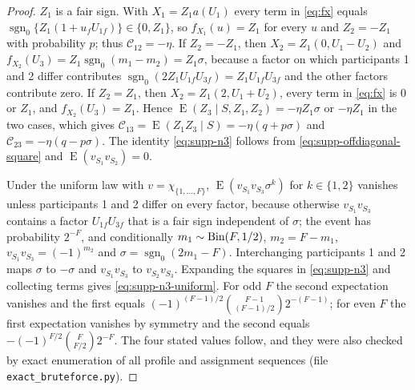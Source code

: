 \documentclass[12pt,a4paper]{article}
\theoremstyle{definition}
\theoremstyle{remark}\newtheorem{remark}{Remark}
\numberwithin{equation}{section}
\newcommand{\E}{\operatorname{E}}
\newcommand{\sg}{\operatorname{sgn}_0}
\begin{document}
\begin{proof}
$Z_1$ is a fair sign. With $X_1=Z_1a(U_1)$ every term in \eqref{eq:fx} equals $\sg\{Z_1(1+u_fU_{1f})\}\in\{0,Z_1\}$, so $f_{X_1}(u)=Z_1$ for every $u$ and $Z_2=-Z_1$ with probability $p$; thus $\mathcal C_{12}=-\eta$. If $Z_2=-Z_1$, then $X_2=Z_1(0,U_1-U_2)$ and $f_{X_2}(U_3)=Z_1\sg(m_1-m_2)=Z_1\sigma$, because a factor on which participants 1 and 2 differ contributes $\sg(2Z_1U_{1f}U_{3f})=Z_1U_{1f}U_{3f}$ and the other factors contribute zero. If $Z_2=Z_1$, then $X_2=Z_1(2,U_1+U_2)$, every term in \eqref{eq:fx} is $0$ or $Z_1$, and $f_{X_2}(U_3)=Z_1$. Hence $\E(Z_3\mid S,Z_1,Z_2)=-\eta Z_1\sigma$ or $-\eta Z_1$ in the two cases, which gives $\mathcal C_{13}=\E(Z_1Z_3\mid S)=-\eta(q+p\sigma)$ and $\mathcal C_{23}=-\eta(q-p\sigma)$. The identity \eqref{eq:supp-n3} follows from \eqref{eq:supp-offdiagonal-square} and $\E(v_{S_1}v_{S_2})=0$.

Under the uniform law with $v=\chi_{\{1,\ldots,F\}}$, $\E(v_{S_1}v_{S_3}\sigma^k)$ for $k\in\{1,2\}$ vanishes unless participants 1 and 2 differ on every factor, because otherwise $v_{S_1}v_{S_3}$ contains a factor $U_{1f}U_{3f}$ that is a fair sign independent of $\sigma$; the event has probability $2^{-F}$, and conditionally $m_1\sim{\rm Bin}(F,1/2)$, $m_2=F-m_1$, $v_{S_1}v_{S_3}=(-1)^{m_2}$ and $\sigma=\sg(2m_1-F)$. Interchanging participants 1 and 2 maps $\sigma$ to $-\sigma$ and $v_{S_1}v_{S_3}$ to $v_{S_2}v_{S_3}$. Expanding the squares in \eqref{eq:supp-n3} and collecting terms gives \eqref{eq:supp-n3-uniform}. For odd $F$ the second expectation vanishes and the first equals $(-1)^{(F-1)/2}\binom{F-1}{(F-1)/2}2^{-(F-1)}$; for even $F$ the first expectation vanishes by symmetry and the second equals $-(-1)^{F/2}\binom{F}{F/2}2^{-F}$. The four stated values follow, and they were also checked by exact enumeration of all profile and assignment sequences (file \texttt{exact\_bruteforce.py}).
\end{proof}
\end{document}
